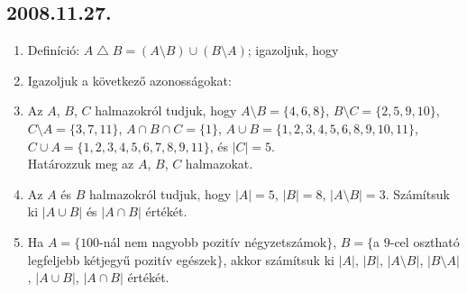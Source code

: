 \subsection*{2008.11.27.}
\begin{enumerate}

\item Definíció: $A{\bigtriangleup}B{=}(A{\setminus}B){\cup}(B{\setminus}A)$;
igazoljuk, hogy

\item Igazoljuk a következő azonosságokat:

\item Az $A$, $B$, $C$ halmazokról tudjuk, hogy $A{\setminus}B{=}\{4,6,8\}$, $B{\setminus}C{=}\{2,5,9,10\}$, $C{\setminus}A{=}\{3,7,11\}$, $A{\cap}B{\cap}C{=}
\{1\}$, $A{\cup}B{=}\{1,2,3,4,5,6,8,9,10,11\}$, $C{\cup}A{=}\{1,2,3,4,5,6,7,8,9,11\}$, és $|C|{=}5$.
\\Határozzuk meg az $A$, $B$, $C$ halmazokat.

\item Az $A$ és $B$ halmazokról tudjuk, hogy $|A|{=}5$, $|B|{=}8$, $|A{\setminus}B|{=}3$.
Számítsuk ki $|A{\cup}B|$ és $|A{\cap}B|$ értékét.

\item Ha $A{=}\{100$-nál nem nagyobb pozitív négyzetszámok$\}$,
 $B{=}\{$a $9$-cel osztható legfeljebb kétjegyű pozitív egészek$\}$,
 akkor számítsuk ki $|A|$, $|B|$,  $|A{\setminus}B|$, $|B{\setminus}A|$,
 $|A{\cup}B|$, $|A{\cap}B|$ értékét.
\end{enumerate}

